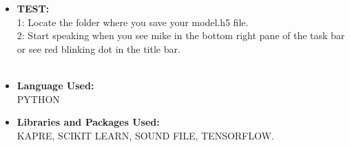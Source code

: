 \documentclass{article}
\begin{document}
\begin{itemize}
\item{\textbf{TEST:}}\\


1: Locate the folder where you save your model.h5 file.\\

2: Start speaking when you see mike in the bottom right pane of the task bar or see red blinking dot in the title bar.\\

\\


\item{\textbf{Language Used:}}\\

PYTHON\\

\item{\textbf{Libraries and Packages Used:}}\\

KAPRE, SCIKIT LEARN, SOUND FILE, TENSORFLOW.\\

\end{itemize}
\end{document}
